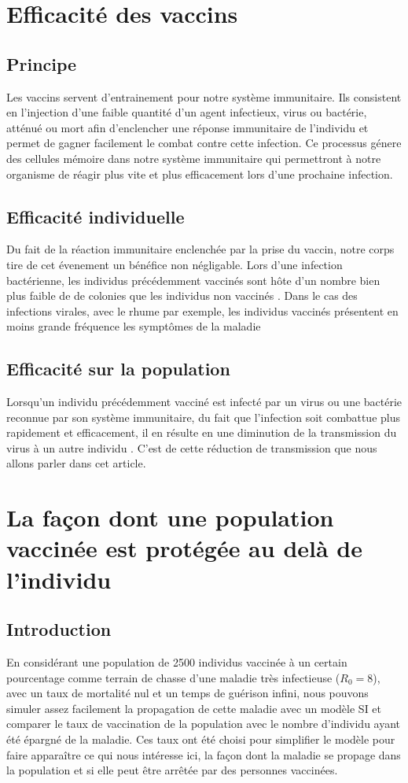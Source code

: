 \documentclass[10pt]{article}
\begin{document}
\section{Efficacité des vaccins}
\subsection{Principe}
Les vaccins servent d'entrainement pour notre système immunitaire. Ils consistent en l'injection d'une faible quantité d'un agent infectieux, virus ou bactérie, atténué ou mort afin d'enclencher une réponse immunitaire de l'individu et permet de gagner facilement le combat contre cette infection. Ce processus génere des cellules mémoire dans notre système immunitaire qui permettront à notre organisme de réagir plus vite et plus efficacement lors d'une prochaine infection.
\subsection{Efficacité individuelle}
Du fait de la réaction immunitaire enclenchée par la prise du vaccin, notre corps tire de cet évenement un bénéfice non négligable. Lors d'une infection bactérienne, les individus précédemment vaccinés sont hôte d'un nombre bien plus faible de de colonies que les individus non vaccinés \cite{Experimental infection of bacteria}. Dans le cas des infections virales, avec le rhume par exemple, les individus vaccinés présentent en moins grande fréquence les symptômes de la maladie \cite{Immune response Sweden 2009}
\subsection{Efficacité sur la population}
Lorsqu'un individu précédemment vacciné est infecté par un virus ou une bactérie reconnue par son système immunitaire, du fait que l'infection soit combattue plus rapidement et efficacement, il en résulte en une diminution de la transmission du virus à un autre individu \cite{vaccine-induced reduction in virus transmission}. C'est de cette réduction de transmission que nous allons parler dans cet article.

\section{La façon dont une population vaccinée est protégée au delà de l'individu}
\subsection{Introduction}
En considérant une population de 2500 individus vaccinée à un certain pourcentage comme terrain de chasse d'une maladie très infectieuse ($R_0=8$), avec un taux de mortalité nul et un temps de guérison infini, nous pouvons simuler assez facilement la propagation de cette maladie avec un modèle SI et comparer le taux de vaccination de la population avec le nombre d'individu ayant été épargné de la maladie. Ces taux ont été choisi pour simplifier le modèle pour faire apparaître ce qui nous intéresse ici, la façon dont la maladie se propage dans la population et si elle peut être arrêtée par des personnes vaccinées.
\end{document}
